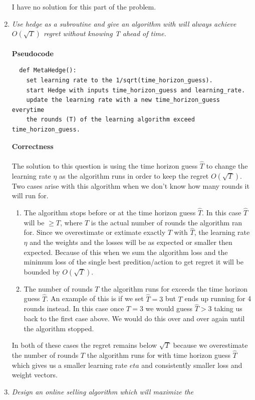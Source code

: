 \documentclass[12pt]{article}
\begin{document}
\begin{enumerate}
  I have no solution for this part of the problem.
  
  \newpage
  \item \textit{Use hedge as a subroutine and give an algorithm with will
  always achieve $O(\sqrt{T})$ regret without knowing T ahead of time.}\\
  \\
  \textbf{Pseudocode}\\
  \begin{verbatim}
  def MetaHedge():
    set learning rate to the 1/sqrt(time_horizon_guess).
    start Hedge with inputs time_horizon_guess and learning_rate.
    update the learning rate with a new time_horizon_guess everytime 
    the rounds (T) of the learning algorithm exceed time_horizon_guess. 
  \end{verbatim}
  \textbf{Correctness}\\
  \\
  The solution to this question is using the time horizon guess $\hat{T}$
  to change the learning rate $\eta$ as the algorithm runs in order to keep the
  regret $O(\sqrt{T})$.  Two cases arise with this algorithm when we don't know how many rounds it will run for.
  \begin{enumerate}
    \item The algorithm stops before or at the time horizon guess
    $\hat{T}$.  In this case $\hat{T}$ will be $\ge T$, where $T$ is the
    actual number of rounds the algorithm ran for.  Since we overestimate or
    extimate exactly $T$ with $\hat{T}$, the learning rate $\eta$ and the
    weights and the losses will be as expected or smaller then expected. 
    Because of this when we sum the algorithm loss and the minimum loss of the
    single best predition/action to get regret it will be bounded by
    $O(\sqrt{T})$.
    \item The number of rounds $T$ the algorithm runs for exceeds the time
    horizon guess $\hat{T}$.  An example of this is if we set $\hat{T} = 3$ but
    $T$ ends up running for 4 rounds instead.  In this case once $T=3$ we would
    guess $\hat{T} > 3$ taking us back to the first case above.  We would do
    this over and over again until the algorithm stopped.
  \end{enumerate}
  In both of these cases the regret remains below $\sqrt{T}$ because we
  overestimate the number of rounds $T$ the algorithm runs for with
  time horizon guess $\hat{T}$ which gives us a smaller learning rate $eta$ and
  consistently smaller loss and weight vectors.
  \newpage
  \item \textit{Design an online selling algorithm which will maximize the
}
\end{enumerate}
\end{document}
